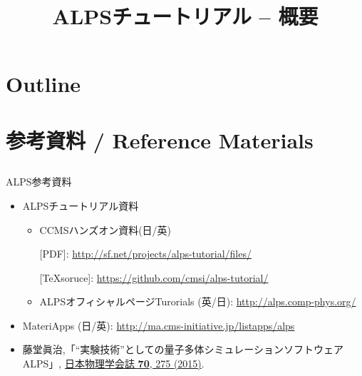 
\title{ALPSチュートリアル -- 概要}




\begin{frame}
  \titlepage
\end{frame}

\section*{Outline}
\begin{frame}[t,fragile]
  \tableofcontents
\end{frame}

\section{参考資料 / Reference Materials}
\subsection*{\redb\whiteb\greenb}

\begin{frame}[t,fragile]{ALPS参考資料}
  \begin{itemize}
    \setlength{\itemsep}{1em}
  \item ALPSチュートリアル資料
    \begin{itemize}
    \item CCMSハンズオン資料(日/英)
      
      [PDF]: {\footnotesize \url{http://sf.net/projects/alps-tutorial/files/}}
      
      [\TeX soruce]: {\footnotesize \url{https://github.com/cmsi/alps-tutorial/}}
      
     \item ALPSオフィシャルページTurorials (英/日): {\footnotesize \url{http://alps.comp-phys.org/}}
    \end{itemize}
  \item MateriApps (日/英): {\footnotesize \url{http://ma.cms-initiative.jp/listapps/alps}}
  \item 藤堂眞治,「``実験技術''としての量子多体シミュレーションソフトウェアALPS」, \href{http://www.jps.or.jp/books/gakkaishi/2015/04/06/70-04exp.pdf}{日本物理学会誌 {\bf 70}, 275 (2015)}.
  \end{itemize}
\end{frame}

